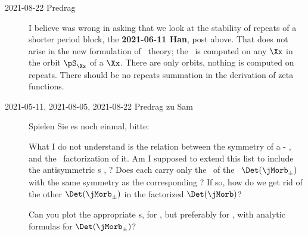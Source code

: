 \begin{description}
    \item[2021-08-22 Predrag]
{\color{red} I believe was wrong in asking that we look at the stability of
repeats of a shorter period block,} the {\bf 2021-06-11 Han},
 post above. {\color{red} That does not arise in
the new formulation of \po\ theory; the \HillDet\ is computed on any
{\lattstate} $\Xx$ in the orbit $\pS_\Xx$  of a
{\lattstate} $\Xx$. There are only orbits, nothing is computed on
repeats. There should be no repeats summation in the derivation of zeta
functions.
    }

    \item[2021-05-11, 2021-08-05, 2021-08-22 Predrag zu Sam]
Spielen Sie es noch einmal, bitte:

What I do not understand is the relation between the symmetry of a
{\lattstate}  - , and the
\HillDet\ factorization of it. Am I supposed to extend this list to
include the antisymmetric {\lattstate}s ,
? Does each carry only the \HillDet\ of the
\jacobianOrb\ $\Det(\jMorb_\pm)$ with the same symmetry as the
corresponding {\lattstate}? If so, how do we get rid of the other
$\Det(\jMorb_\pm)$ in the factorized $\Det(\jMorb)$?

Can you plot the appropriate  {\lattstate}s, for \templatt, but
preferably for \henlatt, with analytic formulas for $\Det(\jMorb_\pm)$?


\end{description}
